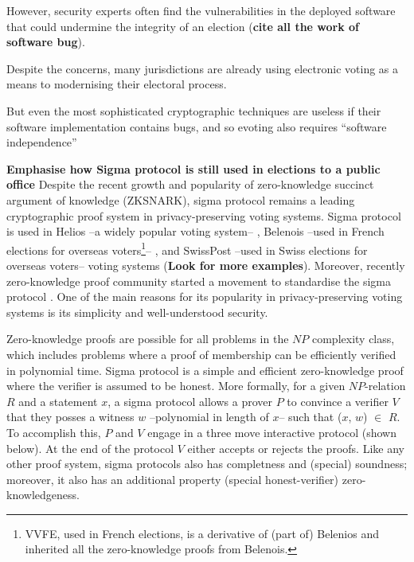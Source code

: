 \documentclass[sigconf]{acmart}
\begin{document}
However, security 
experts often find the vulnerabilities in the deployed software that 
could undermine the integrity of an election (\textbf{cite all the work of 
software bug}). 

Despite the concerns, many jurisdictions are already using 
electronic voting as a means to modernising their electoral process. 

But even the most 
sophisticated cryptographic techniques are useless if their software
implementation contains bugs, and so evoting also requires
“software independence”



\textbf{Emphasise how Sigma protocol is still used in elections to a public office}
Despite the recent growth and popularity of zero-knowledge succinct 
argument of knowledge (ZKSNARK), sigma protocol remains a
leading cryptographic proof system in privacy-preserving voting systems. 
Sigma protocol is used in Helios --a widely popular voting system-- \cite{adida2008helios}, 
Belenois --used in French elections for overseas 
voters\footnote{VVFE, used in French elections, is a derivative of (part of) Belenios and 
inherited all the zero-knowledge proofs from Belenois.}-- \cite{cortier2023french}, and 
SwissPost --used in Swiss elections for overseas voters-- voting 
systems \cite{10.1007/978-3-031-15911-4_4} (\textbf{Look for more examples}). 
Moreover, recently zero-knowledge proof community started a movement to standardise
the sigma protocol \cite{ZKProof}.
One of the main reasons for its popularity in privacy-preserving voting systems is its simplicity and 
well-understood security.  

Zero-knowledge proofs are possible for all problems in the $NP$ complexity class, which 
includes problems where a proof of membership can be efficiently verified in polynomial time.
Sigma protocol is a simple and efficient zero-knowledge proof where the verifier  is assumed to be honest. 
More formally, for a given $NP$-relation $R$ and a statement $x$, a sigma protocol allows a prover 
$P$ to convince a verifier $V$ that they posses a witness $w$ --polynomial in length of $x$-- such 
that ($x$, $w$) $\in$ $R$. To accomplish this, $P$ and $V$ engage in a three move 
interactive protocol (shown below). At the end of the protocol $V$ either accepts or rejects the proofs.
Like any other proof system, sigma protocols also has completness and (special) soundness; moreover,  
it also has an additional property (special honest-verifier) zero-knowledgeness. 
\end{document}
